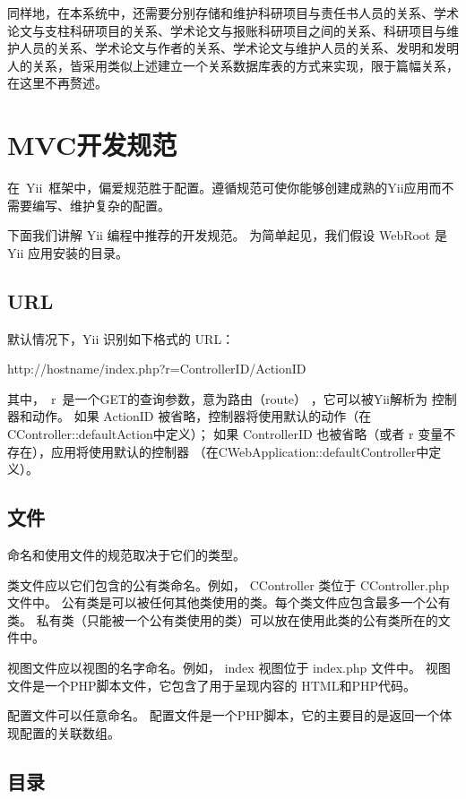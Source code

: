 同样地，在本系统中，还需要分别存储和维护科研项目与责任书人员的关系、学术论文与支柱科研项目的关系、学术论文与报账科研项目之间的关系、科研项目与维护人员的关系、学术论文与作者的关系、学术论文与维护人员的关系、发明和发明人的关系，皆采用类似上述建立一个关系数据库表的方式来实现，限于篇幅关系，在这里不再赘述。

\section{MVC开发规范}
在~Yii~框架中，偏爱规范胜于配置。遵循规范可使你能够创建成熟的Yii应用而不需要编写、维护复杂的配置。 

下面我们讲解 Yii 编程中推荐的开发规范。 为简单起见，我们假设 WebRoot 是 Yii 应用安装的目录。

\subsection{URL}
默认情况下，Yii 识别如下格式的 URL：

http://hostname/index.php?r=ControllerID/ActionID

其中，~r~是一个GET的查询参数，意为路由（route） ，它可以被Yii解析为 控制器和动作。 如果 ActionID 被省略，控制器将使用默认的动作（在CController::defaultAction中定义）； 如果 ControllerID 也被省略（或者 r 变量不存在），应用将使用默认的控制器 （在CWebApplication::defaultController中定义）。

\subsection{文件}

命名和使用文件的规范取决于它们的类型。

类文件应以它们包含的公有类命名。例如， CController 类位于 CController.php 文件中。 公有类是可以被任何其他类使用的类。每个类文件应包含最多一个公有类。 私有类（只能被一个公有类使用的类）可以放在使用此类的公有类所在的文件中。

视图文件应以视图的名字命名。例如， index 视图位于 index.php 文件中。 视图文件是一个PHP脚本文件，它包含了用于呈现内容的 HTML和PHP代码。

配置文件可以任意命名。 配置文件是一个PHP脚本，它的主要目的是返回一个体现配置的关联数组。

\subsection{目录}
\label{yiiprotocoldir}

